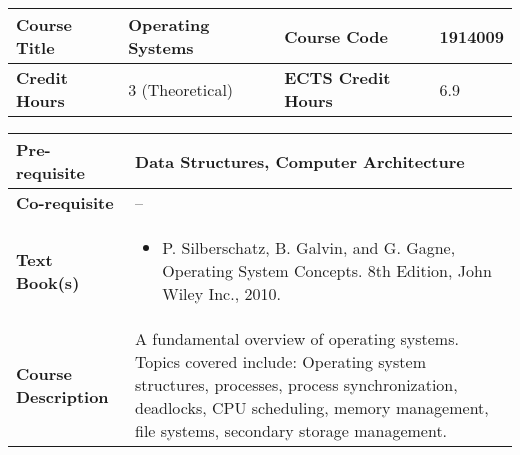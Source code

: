 \documentclass[12pt]{article}
\begin{document}
\begin{minipage}{\textwidth}
\begin{tabularx}{\textwidth}{|l|X|l|X|}
\hline
\textbf{Course Title}       &   Operating Systems & \textbf{Course Code}       &  1914009 \\ \hline
\textbf{Credit Hours}       &  3  (Theoretical) & \textbf{ECTS Credit Hours}       &   6.9 \\ \hline
\end{tabularx}

\begin{tabularx}{\textwidth}{|l|X|}
\hline
\textbf{Pre-requisite}      &   Data Structures, Computer Architecture \\ \hline
\textbf{Co-requisite}       &  -- \\ \hline
\textbf{Text Book(s)}      & \begin{minipage}{.70\textwidth}
					\begin{itemize} \itemsep-0.4em
						\vspace{3mm}
						\item P. Silberschatz, B. Galvin, and G. Gagne, Operating System Concepts. 8th Edition, John Wiley Inc., 2010.
						\vspace{3mm}
					\end{itemize}
				\end{minipage}  \\ \hline
\textbf{Course Description} & \begin{minipage}{.70\textwidth}
					\vspace{3mm}
					A fundamental overview of operating systems. Topics covered include: Operating system structures, processes, 
					process synchronization, deadlocks, CPU scheduling, memory management, file systems, secondary storage management.

					\vspace{3mm}
					\end{minipage} \\ \hline
\end{tabularx}
\end{minipage}


\bigskip
\bigskip
\end{document}
